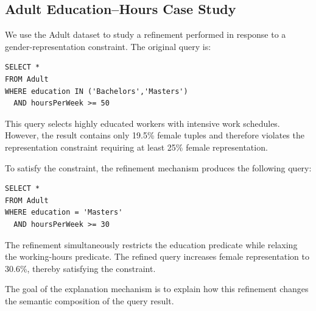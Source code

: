 
\subsection{Adult Education--Hours Case Study}

We use the Adult dataset to study a refinement performed in response to
a gender-representation constraint. The original query is:

\begin{verbatim}
SELECT *
FROM Adult
WHERE education IN ('Bachelors','Masters')
  AND hoursPerWeek >= 50
\end{verbatim}

This query selects highly educated workers with intensive work schedules.
However, the result contains only 19.5\% female tuples and therefore
violates the representation constraint requiring at least 25\% female
representation.

To satisfy the constraint, the refinement mechanism produces the
following query:

\begin{verbatim}
SELECT *
FROM Adult
WHERE education = 'Masters'
  AND hoursPerWeek >= 30
\end{verbatim}

The refinement simultaneously restricts the education predicate while
relaxing the working-hours predicate. The refined query increases female
representation to 30.6\%, thereby satisfying the constraint.

The goal of the explanation mechanism is to explain how this refinement
changes the semantic composition of the query result.

